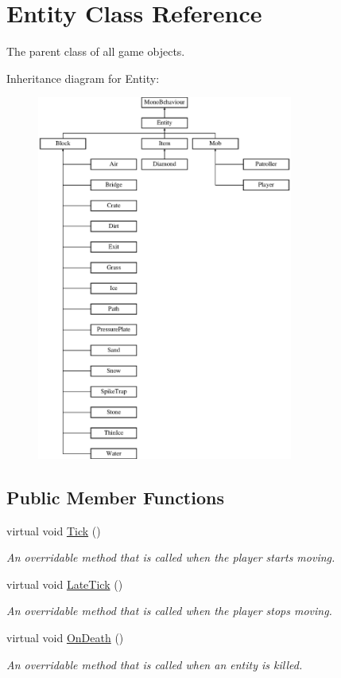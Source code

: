 \hypertarget{class_entity}{}\section{Entity Class Reference}
\label{class_entity}


The parent class of all game objects.  


Inheritance diagram for Entity\+:\begin{figure}[H]
\begin{center}
\leavevmode
\includegraphics[height=12.000000cm]{class_entity}
\end{center}
\end{figure}
\subsection*{Public Member Functions}
\begin{DoxyCompactItemize}
\item 
virtual void \mbox{\hyperlink{class_entity_a7a09da64c6d87cd1bce0bb69512d82fc}{Tick}} ()
\begin{DoxyCompactList}\small\item\em An overridable method that is called when the player starts moving. \end{DoxyCompactList}\item 
virtual void \mbox{\hyperlink{class_entity_a80e2936e1d8d8590dc183b2980fcd3c9}{Late\+Tick}} ()
\begin{DoxyCompactList}\small\item\em An overridable method that is called when the player stops moving. \end{DoxyCompactList}\item 
virtual void \mbox{\hyperlink{class_entity_a6039178e15537a356d8fde707c9e0b69}{On\+Death}} ()
\begin{DoxyCompactList}\small\item\em An overridable method that is called when an entity is killed. \end{DoxyCompactList}\end{DoxyCompactItemize}
